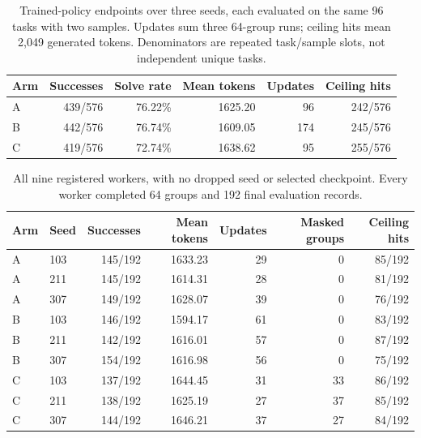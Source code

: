 \documentclass[11pt]{article}
\begin{document}
\begin{table}[htbp]
\centering\small
\begin{tabular}{@{}lrrrrr@{}}
\toprule
Arm & Successes & Solve rate & Mean tokens & Updates & Ceiling hits \\
\midrule
A & 439/576 & 76.22\% & 1625.20 & 96 & 242/576 \\
B & 442/576 & 76.74\% & 1609.05 & 174 & 245/576 \\
C & 419/576 & 72.74\% & 1638.62 & 95 & 255/576 \\
\bottomrule
\end{tabular}
\caption{Trained-policy endpoints over three seeds, each evaluated on the same 96 tasks with two samples. Updates sum three 64-group runs; ceiling hits mean 2,049 generated tokens. Denominators are repeated task/sample slots, not independent unique tasks.}
\label{tab:mechanism-arms}
\end{table}

\begin{table}[htbp]
\centering\small
\begin{tabular}{@{}llrrrrr@{}}
\toprule
Arm & Seed & Successes & Mean tokens & Updates & Masked groups & Ceiling hits \\
\midrule
A & 103 & 145/192 & 1633.23 & 29 & 0 & 85/192 \\
A & 211 & 145/192 & 1614.31 & 28 & 0 & 81/192 \\
A & 307 & 149/192 & 1628.07 & 39 & 0 & 76/192 \\
B & 103 & 146/192 & 1594.17 & 61 & 0 & 83/192 \\
B & 211 & 142/192 & 1616.01 & 57 & 0 & 87/192 \\
B & 307 & 154/192 & 1616.98 & 56 & 0 & 75/192 \\
C & 103 & 137/192 & 1644.45 & 31 & 33 & 86/192 \\
C & 211 & 138/192 & 1625.19 & 27 & 37 & 85/192 \\
C & 307 & 144/192 & 1646.21 & 37 & 27 & 84/192 \\
\bottomrule
\end{tabular}
\caption{All nine registered workers, with no dropped seed or selected checkpoint. Every worker completed 64 groups and 192 final evaluation records.}
\label{tab:mechanism-workers}
\end{table}
\end{document}
